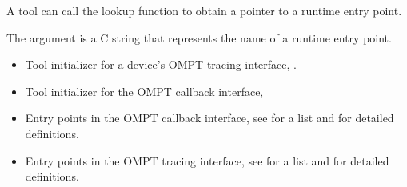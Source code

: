 A tool can call the lookup function to obtain a pointer to a runtime
entry point.

\argdesc
The argument  is a C string
that represents the name of a runtime entry point.

\crossreferences
\begin{itemize}
\item Tool initializer for a device's OMPT tracing interface, 
.
\item Tool initializer for the OMPT callback interface, 
\item Entry points in the OMPT callback interface, see
   for a list and
   for detailed definitions.
\item Entry points in the OMPT tracing interface, see
   for a list and
   for detailed definitions.
\end{itemize}
